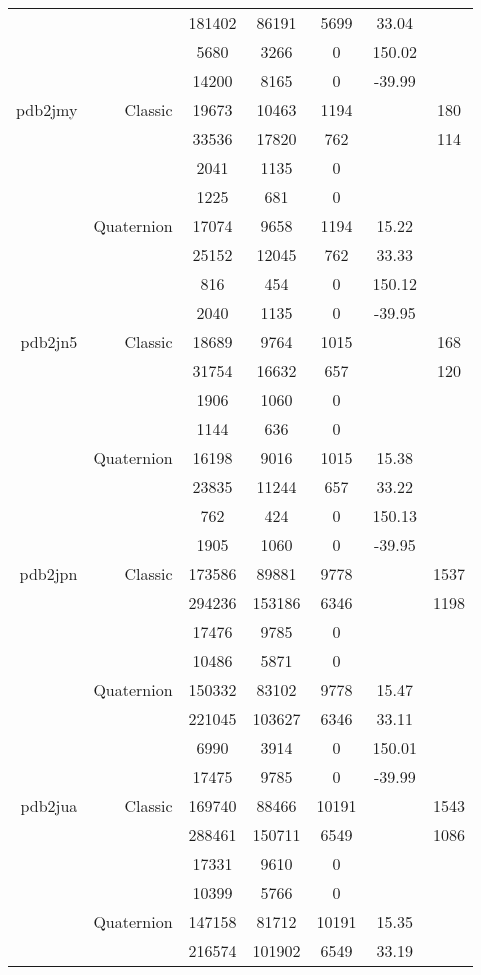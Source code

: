 \begin{xltabular}{\textwidth}{r|rcccSc}
& & 181402 & 86191 & 5699 & 33.04 & \\
& & 5680 & 3266 & 0 & 150.02 & \\
& & 14200 & 8165 & 0 & -39.99 & \\ \addlinespace
pdb2jmy & Classic & 19673 & 10463 & 1194 & & 180 \\
& & 33536 & 17820 & 762 & & 114 \\
& & 2041 & 1135 & 0 & & \\
& & 1225 & 681 & 0 & & \\
& Quaternion & 17074 & 9658 & 1194 & 15.22 & \\
& & 25152 & 12045 & 762 & 33.33 & \\
& & 816 & 454 & 0 & 150.12 & \\
& & 2040 & 1135 & 0 & -39.95 & \\ \addlinespace
pdb2jn5 & Classic & 18689 & 9764 & 1015 & & 168 \\
& & 31754 & 16632 & 657 & & 120 \\
& & 1906 & 1060 & 0 & & \\
& & 1144 & 636 & 0 & & \\
& Quaternion & 16198 & 9016 & 1015 & 15.38 & \\
& & 23835 & 11244 & 657 & 33.22 & \\
& & 762 & 424 & 0 & 150.13 & \\
& & 1905 & 1060 & 0 & -39.95 & \\ \addlinespace
pdb2jpn & Classic & 173586 & 89881 & 9778 & & 1537 \\
& & 294236 & 153186 & 6346 & & 1198 \\
& & 17476 & 9785 & 0 & & \\
& & 10486 & 5871 & 0 & & \\
& Quaternion & 150332 & 83102 & 9778 & 15.47 & \\
& & 221045 & 103627 & 6346 & 33.11 & \\
& & 6990 & 3914 & 0 & 150.01 & \\
& & 17475 & 9785 & 0 & -39.99 & \\ \addlinespace
pdb2jua & Classic & 169740 & 88466 & 10191 & & 1543 \\
& & 288461 & 150711 & 6549 & & 1086 \\
& & 17331 & 9610 & 0 & & \\
& & 10399 & 5766 & 0 & & \\
& Quaternion & 147158 & 81712 & 10191 & 15.35 & \\
& & 216574 & 101902 & 6549 & 33.19 & \\

\end{xltabular}
